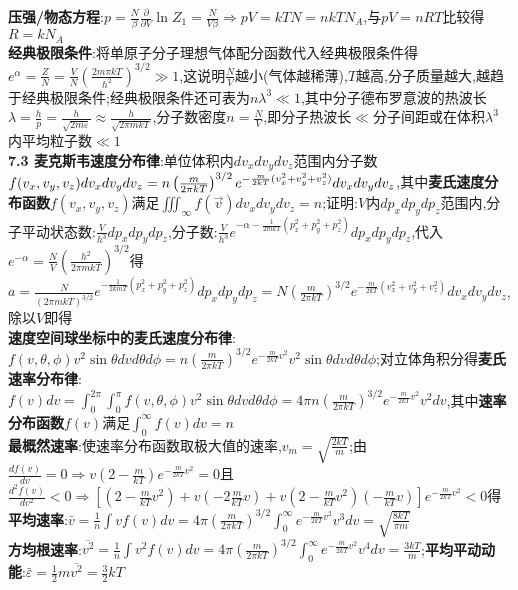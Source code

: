 \documentclass[10pt,a4paper]{article}
\begin{document}
\begin{multicols}{2}
\textbf{压强/物态方程}:$p=\frac{N}{\beta}\frac{\partial}{\partial V}\ln Z_1=\frac{N}{V\beta}\Rightarrow pV=kTN=nkTN_A$,与$pV=nRT$比较得$R=kN_A$\\
\textbf{经典极限条件}:将单原子分子理想气体配分函数代入经典极限条件得$e^{\alpha}=\frac{Z}{N}=\frac{V}{N}\left(\frac{2m\pi kT}{h^2}\right)^{3/2}\gg1$,这说明$\frac{N}{V}$越小(气体越稀薄),$T$越高,分子质量越大,越趋于经典极限条件;经典极限条件还可表为$n\lambda^3\ll1$,其中分子德布罗意波的热波长$\lambda=\frac{h}{p}=\frac{h}{\sqrt{2m\varepsilon}}\approx\frac{h}{\sqrt{2\pi mkT}}$,分子数密度$n=\frac{N}{V}$,即分子热波长$\ll$分子间距或在体积$\lambda^3$内平均粒子数$\ll1$\\
\textbf{7.3 麦克斯韦速度分布律}:单位体积内$dv_xdv_ydv_z$范围内分子数$f(v_x,v_y,v_z)dv_xdv_ydv_z=n\left(\frac{m}{2\pi kT}\right)^{3/2}\\e^{-\frac{m}{2kT}(v_x^2+v_y^2+v_z^2)}dv_xdv_ydv_z$,其中\textbf{麦氏速度分布函数}$f(v_x,v_y,v_z)$满足$\iiint_{\infty}f(\vec{v})dv_xdv_ydv_z=n$;证明:$V$内$dp_xdp_ydp_z$范围内,分子平动状态数:$\frac{V}{h^3}dp_xdp_ydp_z$,分子数:$\frac{V}{h^3}e^{-\alpha-\frac{1}{2mkT}(p_x^2+p_y^2+p_z^2)}dp_xdp_ydp_z$,代入$e^{-\alpha}=\frac{N}{V}\left(\frac{h^2}{2\pi mkT}\right)^{3/2}$得$a=\frac{N}{(2\pi mkT)^{3/2}}e^{-\frac{1}{2kmT}(p_x^2+p_y^2+p_z^2)}dp_xdp_ydp_z=N\left(\frac{m}{2\pi kT}\right)^{3/2}e^{-\frac{m}{2kT}(v_x^2+v_y^2+v_z^2)}dv_xdv_ydv_z$,除以$V$即得\\
\textbf{速度空间球坐标中的麦氏速度分布律}:$f(v,\theta,\phi)v^2\sin\theta dvd\theta d\phi=n\left(\frac{m}{2\pi kT}\right)^{3/2}e^{-\frac{m}{2kT}v^2}v^2\sin\theta dvd\theta d\phi$;对立体角积分得\textbf{麦氏速率分布律}:$f(v)dv=\int_0^{2\pi}\int_{0}^{\pi}f(v,\theta,\phi)v^2\sin\theta dvd\theta d\phi=4\pi n\left(\frac{m}{2\pi kT}\right)^{3/2}e^{-\frac{m}{2kT}v^2}v^2dv$,其中\textbf{速率分布函数}$f(v)$满足$\int_0^{\infty}f(v)dv=n$\\
\textbf{最概然速率}:使速率分布函数取极大值的速率,$v_m=\sqrt{\frac{2kT}{m}}$;由$\frac{df(v)}{dv}=0\Rightarrow v\left(2-\frac{m}{kT}\right)e^{-\frac{m}{2kT}v^2}=0$且$\frac{d^2f(v)}{dv^2}<0\Rightarrow\left[\left(2-\frac{m}{kT}v^2\right)+v\left(-2\frac{m}{kT}v\right)+v\left(2-\frac{m}{kT}v^2\right)\left(-\frac{m}{kT}v\right)\right]e^{-\frac{m}{2kT}v^2}<0$得\\
\textbf{平均速率}:$\bar{v}=\frac{1}{n}\int vf(v)dv=4\pi\left(\frac{m}{2\pi kT}\right)^{3/2}\int_0^{\infty}e^{-\frac{m}{2kT}v^2}v^3dv=\sqrt{\frac{8kT}{\pi m}}$\\
\textbf{方均根速率}:$\overline{v^2}=\frac{1}{n}\int v^2f(v)dv=4\pi\left(\frac{m}{2\pi kT}\right)^{3/2}\int_0^{\infty}e^{-\frac{m}{2kT}v^2}v^4dv=\frac{3kT}{m}$;\textbf{平均平动动能}:$\bar{\varepsilon}=\frac{1}{2}m\overline{v^2}=\frac{3}{2}kT$\\

\end{multicols}
\end{document}
